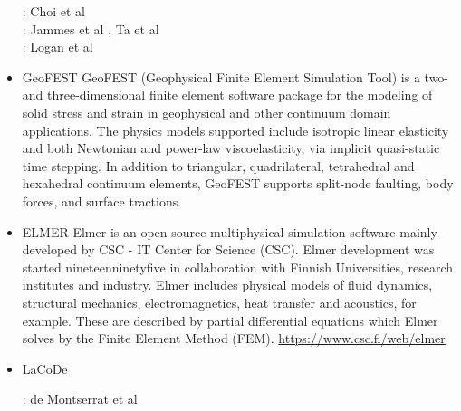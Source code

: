\begin{itemize}
\begin{scriptsize} 
\twothousandthirteen: Choi et al \cite{chtl13}\\
\twothousandfifteen: Jammes et al \cite{jalr15}, Ta et al \cite{tact15}\\
\twothousandseventeen: Logan et al \cite{lolc17}
\end{scriptsize} 

\item {\codefont GeoFEST} 
GeoFEST (Geophysical Finite Element Simulation Tool) is a two- and three-dimensional finite
element software package for the modeling of solid stress and strain in geophysical and 
other continuum domain applications.
The physics models supported include isotropic linear elasticity and both Newtonian and power-law
viscoelasticity, via implicit quasi-static time stepping. In addition to triangular, 
quadrilateral, tetrahedral and hexahedral continuum elements, GeoFEST supports split-node 
faulting, body forces, and surface tractions.


{\small
\noindent
\cite{paln08}
}

\item {\codefont ELMER} 
Elmer is an open source multiphysical simulation software mainly developed by 
CSC - IT Center for Science (CSC). Elmer development was started nineteenninetyfive in collaboration with 
Finnish Universities, research institutes and industry. Elmer includes physical models of 
fluid dynamics, structural mechanics, electromagnetics, heat transfer and acoustics, 
for example. These are described by partial differential equations which Elmer solves 
by the Finite Element Method (FEM). \url{https://www.csc.fi/web/elmer}

\cite{maierova}
\cite{mals14}

\item {\codefont LaCoDe}  

\begin{scriptsize}
\noindent
\twothousandnineteen: de Montserrat et al \cite{demh19}
\end{scriptsize}


\end{itemize}
